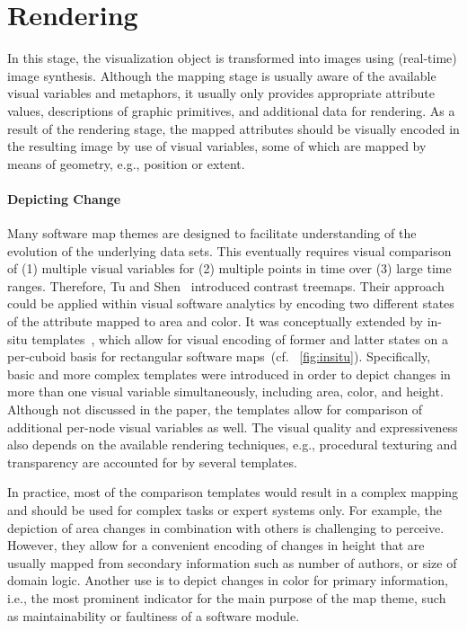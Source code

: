 \documentclass[sigconf]{acmart}
\def\eg{e.g., }
\def\ie{i.e., }
\def\cf{cf. }
\begin{document}
\section{Rendering}
\par
In this stage, the visualization object is transformed into images using (real-time) image synthesis. 
Although the mapping stage is usually aware of the available visual variables and metaphors, it usually  only provides appropriate attribute values, descriptions of graphic primitives, and additional data for rendering.
As a result of the rendering stage, the mapped attributes should be visually encoded in the resulting image by use of visual variables, some of which are mapped by means of geometry, \eg position or extent.
\paragraph{Depicting Change}
Many software map themes are designed to facilitate understanding of the evolution of the underlying data sets.
This eventually requires visual comparison of (1) multiple visual variables for (2) multiple points in time over (3) large time ranges.
Therefore, Tu and Shen~\cite{tu2007-changes} introduced contrast treemaps.
Their approach could be applied within visual software analytics by encoding two different states of the attribute mapped to area and color.
It was conceptually extended by in-situ templates~\cite{limberger2019-insitu}, which allow for visual encoding of former and latter states on a per-cuboid basis for rectangular software maps~(\cf~\autoref{fig:insitu}).
Specifically, basic and more complex templates were introduced in order to depict changes in more than one visual variable simultaneously, including area, color, and height.
Although not discussed in the paper, the templates allow for comparison of additional per-node visual variables as well.
The visual quality and expressiveness also depends on the available rendering techniques, \eg procedural texturing and transparency are accounted for by several templates.
\par
In practice, most of the comparison templates would result in a complex mapping and should be used for complex tasks or expert systems only.
For example, the depiction of area changes in combination with others is challenging to perceive.
However, they allow for a convenient encoding of changes in height that are usually mapped from secondary information such as number of authors, or size of domain logic.
Another use is to depict changes in color for primary information, \ie the most prominent indicator for the main purpose of the map theme, such as maintainability or faultiness of a software module.
\end{document}
